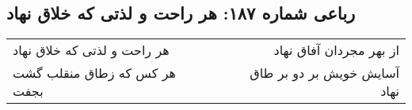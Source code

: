 \begin{center}
\section*{رباعی شماره ۱۸۷: هر راحت و لذتی که خلاق نهاد}
\label{sec:sh187}
\begin{longtable}{l p{0.5cm} r}
هر راحت و لذتی که خلاق نهاد
&&
از بهر مجردان آفاق نهاد
\\
هر کس که زطاق منقلب گشت بجفت
&&
آسایش خویش بر دو بر طاق نهاد
\\
\end{longtable}
\end{center}
